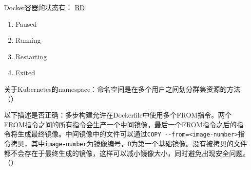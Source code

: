 \begin{problem}
	Docker容器的状态有：
	\uline{BD}    
    \vspace{-0.8em}
    \begin{multicols}{4}
        \begin{enumerate}[label=\Alph*.]
            \item Paused
            \item Running
            \item Restarting
            \item Exited
        \end{enumerate}
    \end{multicols}
    \vspace{-1em}
\end{problem}



\begin{problem}
	关于Kubernetes的namespace：命名空间是在多个用户之间划分群集资源的方法
    \hfill （）
\end{problem}



\begin{problem}
    以下描述是否正确：多步构建允许在Dockerfile中使用多个FROM指令。两个FROM指令之间的所有指令会生产一个中间镜像，最后一个FROM指令之后的指令将生成最终镜像。中间镜像中的文件可以通过\verb|COPY --from=<image-number>|指令拷贝，其中\verb|image-number|为镜像编号，0为第一个基础镜像。没有被拷贝的文件都不会存在于最终生成的镜像，这样可以减小镜像大小，同时避免出现安全问题。
    \hfill （）
\end{problem}



